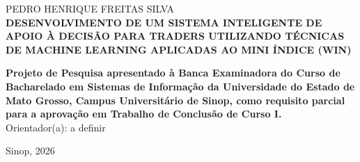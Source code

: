 \begin{center}

    {\small PEDRO HENRIQUE FREITAS SILVA\\}
    \vspace{6cm}
    {\small \textbf{DESENVOLVIMENTO DE UM SISTEMA INTELIGENTE DE APOIO À DECISÃO PARA TRADERS UTILIZANDO TÉCNICAS DE MACHINE LEARNING APLICADAS AO MINI ÍNDICE (WIN)}\\}
    \vspace{1cm}
    \hspace{.45\linewidth}
    \begin{minipage}{.50\linewidth}

        \small \textbf{Projeto de Pesquisa apresentado à Banca Examinadora do Curso de Bacharelado em Sistemas de Informação da Universidade do Estado de Mato Grosso, Campus Universitário de Sinop, como requisito parcial para a aprovação em Trabalho de Conclusão de Curso I.} \\

        \small Orientador(a): a definir

    \end{minipage}

    \vspace{2cm}
    \vfill
    {\small Sinop, 2026}
\end{center}
